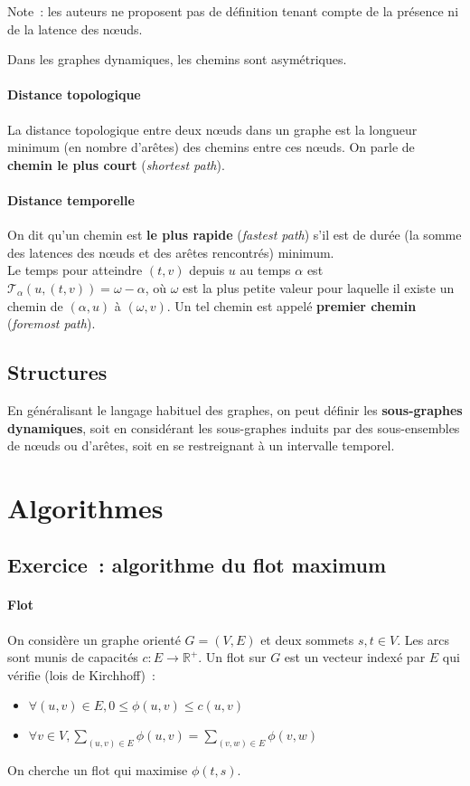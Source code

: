 \documentclass[12pt,a4paper]{article}
\begin{document}
Note~: les auteurs ne proposent pas de définition tenant compte de la
présence ni de la latence des nœuds.

Dans les graphes dynamiques, les chemins sont asymétriques.

\paragraph{Distance topologique} La distance topologique entre deux
nœuds dans un graphe est la longueur minimum (en nombre d'arêtes) des
chemins entre ces nœuds. On parle de \textbf{chemin le plus court}
(\textit{shortest path}).

\paragraph{Distance temporelle}
On dit qu'un chemin est \textbf{le plus rapide} (\textit{fastest
  path}) s'il est de durée (la somme des latences des nœuds et des
arêtes rencontrés) minimum.\\
Le temps pour atteindre \((t, v)\) depuis \(u\) au temps \(\alpha\)
est \(\mathcal{T}_{\alpha}(u, (t, v)) = \omega - \alpha\), où
\(\omega\) est la plus petite valeur pour laquelle il existe un chemin
de \((\alpha, u)\) à \((\omega, v)\). Un tel chemin est appelé
\textbf{premier chemin} (\textit{foremost path}).

\subsection{Structures}

En généralisant le langage habituel des graphes, on peut définir les
\textbf{sous-graphes dynamiques}, soit en considérant les sous-graphes
induits par des sous-ensembles de nœuds ou d'arêtes, soit en se
restreignant à un intervalle temporel.

\section{Algorithmes}

\subsection{Exercice~: algorithme du flot maximum}
\paragraph{Flot} On considère un graphe orienté \(G = (V, E)\) et deux
sommets \(s, t \in V\). Les arcs sont munis de capacités \(c : E \to
\mathbb{R}^{+}\).
Un flot sur \(G\) est un vecteur indexé par \(E\) qui vérifie (lois de
Kirchhoff)~:
\begin{itemize}
\item \(\forall (u, v) \in E, 0 \leq \phi(u, v) \leq c(u, v)\)
\item \(\forall v \in V, \sum_{(u, v) \in E} \phi(u, v) = \sum_{(v, w)
    \in E} \phi(v, w)\)
\end{itemize}
On cherche un flot qui maximise \(\phi(t, s)\).
\end{document}
